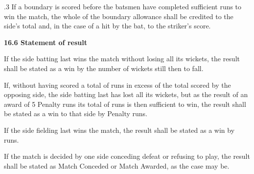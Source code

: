 \documentclass[12pt]{article}
\begin{document}
\vspace{\baselineskip}
\begin{adjustwidth}{0.5in}{0.0in}
{\fontsize{9pt}{10.8pt}.3 \tabto{0.49in} If a boundary is scored before the batsmen have completed sufficient runs to win the match, the whole of the boundary allowance shall be credited to the side’s total and, in the case of a hit by the bat, to the striker’s score.\par}\par

\end{adjustwidth}


\vspace{\baselineskip}
{\fontsize{11pt}{13.2pt}\selectfont \textbf{16.6 \tabto{0.47in} Statement of result}\par}\par


\vspace{\baselineskip}
{\fontsize{9pt}{10.8pt}\selectfont If the side batting last wins the match without losing all its wickets, the result shall be stated as a win by the number of wickets still then to fall.\par}\par


\vspace{\baselineskip}
\begin{adjustwidth}{0.0in}{0.19in}
\begin{justify}
{\fontsize{9pt}{10.8pt}\selectfont If, without having scored a total of runs in excess of the total scored by the opposing side, the side batting last has lost all its wickets, but as the result of an award of 5 Penalty runs its total of runs is then sufficient to win, the result shall be stated as a win to that side by Penalty runs.\par}
\end{justify}\par

\end{adjustwidth}


\vspace{\baselineskip}
{\fontsize{9pt}{10.8pt}\selectfont If the side fielding last wins the match, the result shall be stated as a win by runs.\par}\par


\vspace{\baselineskip}
\begin{adjustwidth}{0.0in}{0.6in}
{\fontsize{9pt}{10.8pt}\selectfont If the match is decided by one side conceding defeat or refusing to play, the result shall be stated as Match Conceded or Match Awarded, as the case may be.\par}\par

\end{adjustwidth}
\end{document}
